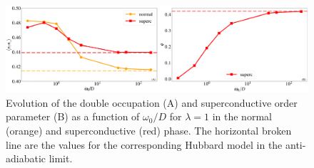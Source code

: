 \documentclass[edipack2.tex]{subfiles}
\begin{document}
\begin{figure}[ht!]
    \includegraphics[width=\linewidth]{figures/figBethe_Holstein.pdf}
    \caption{\label{figEx5}
      Evolution of the  double occupation (A) and superconductive order parameter (B) as a function of $\omega_0/D$ for $\lambda=1$ in the normal (orange) and superconductive (red) phase. The horizontal broken line are the values for the corresponding Hubbard model in the anti-adiabatic limit.}
\end{figure}
\end{document}

